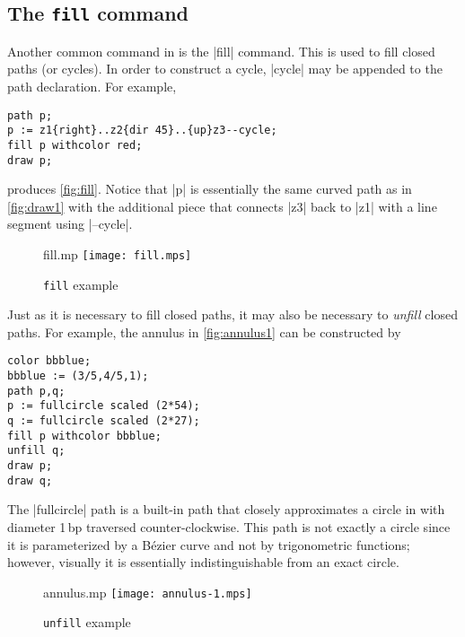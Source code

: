 \subsection{The \texttt{fill} command}

Another common command in \MP{} is the |fill| command.  This is used to
fill closed paths (or cycles).  In order to construct a cycle, |cycle|
may be appended to the path declaration.  For example,

\begin{lstlisting}[style=MP]
path p;
p := z1{right}..z2{dir 45}..{up}z3--cycle;
fill p withcolor red;
draw p;
\end{lstlisting}
produces \autoref{fig:fill}.  Notice that |p| is essentially the same
curved path as in \autoref{fig:draw1} with the additional piece that
connects |z3| back to |z1| with a line segment using |--cycle|.

\begin{figure}
  \begin{withattachment}{fill.mp}
    \centering
    \texttt{[image: fill.mps]}
  \end{withattachment}
  \caption{\texttt{fill} example}
  \label{fig:fill}
\end{figure}

Just as it is necessary to fill closed paths, it may also be necessary
to \textit{unfill} closed paths.  For example, the annulus in
\autoref{fig:annulus1} can be constructed by

\begin{lstlisting}[style=MP]
color bbblue;
bbblue := (3/5,4/5,1);
path p,q;
p := fullcircle scaled (2*54);
q := fullcircle scaled (2*27);
fill p withcolor bbblue;
unfill q;
draw p;
draw q;
\end{lstlisting}

The |fullcircle| path is a built-in path that closely
approximates a circle in \MP{} with diameter 1\,bp traversed
counter-clockwise.  This path is not exactly a circle since it is
parameterized by a B\'{e}zier curve and not by trigonometric functions;
however, visually it is essentially indistinguishable from an exact
circle.

\begin{figure}
  \begin{withattachment}{annulus.mp}
    \centering
    \texttt{[image: annulus-1.mps]}
  \end{withattachment}
  \caption{\texttt{unfill} example}
  \label{fig:annulus1}
\end{figure}

